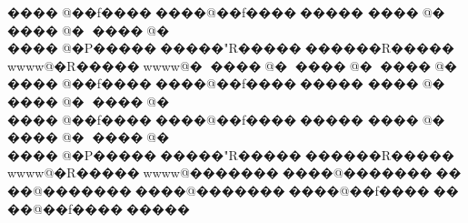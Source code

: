 {{{{{{{{{{{{{{{{{{{{{{{{{{{{{{{{{{{{{{{{{{{{{{{{{{{{{{{{{{{{{{{{{{{{{{{{{{{{{{{{{{{{{{{{����       @��f����� � � �@��f����� � � ��%
����       @�
����       @�
����       @�
����       @�P������ � � ��"R������ � � ���R�����w w w w@�R�����w w w w@�
����       @�
����       @�
����       @�
����       @��f����� � � �@��f����� � � ��%
����       @�
����       @�
����       @�
����       @��f����� � � �@��f����� � � ��%
����       @�
����       @�
����       @�
����       @�P������ � � ��"R������ � � ���R�����w w w w@�R�����w w w w@�������   ����@�������   ����@�������   ����@�������   ����@��f����� � � �@��f����� � � ��%
}}}}}}}}}}}}}}}}}}}}}}}}}}}}}}}}}}}}}}}}}}}}}}}}}}}}}}}}}}}}}}}}}}}}}}}}}}}}}}}}}}}}}}}}
